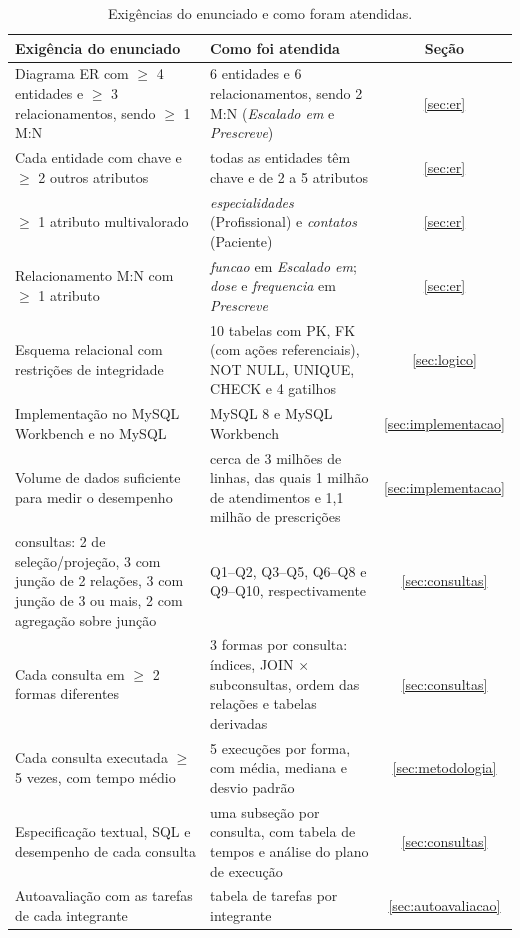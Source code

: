 \documentclass[10pt,a4paper]{article}
\begin{document}
\begin{table}[H]
\centering\footnotesize
\caption{Exigências do enunciado e como foram atendidas.}
\label{tab:requisitos}
\begin{tabularx}{\textwidth}{>{\raggedright\arraybackslash}p{5.6cm}Xc}
\toprule
Exigência do enunciado & Como foi atendida & Seção \\
\midrule
Diagrama ER com $\geq$ 4 entidades e $\geq$ 3 relacionamentos, sendo $\geq$ 1 M:N & 6 entidades e 6 relacionamentos, sendo 2 M:N (\emph{Escalado em} e \emph{Prescreve}) & \ref{sec:er} \\
Cada entidade com chave e $\geq$ 2 outros atributos & todas as entidades têm chave e de 2 a 5 atributos & \ref{sec:er} \\
$\geq$ 1 atributo multivalorado & \emph{especialidades} (Profissional) e \emph{contatos} (Paciente) & \ref{sec:er} \\
Relacionamento M:N com $\geq$ 1 atributo & \emph{funcao} em \emph{Escalado em}; \emph{dose} e \emph{frequencia} em \emph{Prescreve} & \ref{sec:er} \\
Esquema relacional com restrições de integridade & 10 tabelas com PK, FK (com ações referenciais), NOT NULL, UNIQUE, CHECK e 4 gatilhos & \ref{sec:logico} \\
Implementação no MySQL Workbench e no MySQL & MySQL 8 e MySQL Workbench & \ref{sec:implementacao} \\
Volume de dados suficiente para medir o desempenho & cerca de 3 milhões de linhas, das quais 1 milhão de atendimentos e 1,1 milhão de prescrições & \ref{sec:implementacao} \\
10 consultas: 2 de seleção/projeção, 3 com junção de 2 relações, 3 com junção de 3 ou mais, 2 com agregação sobre junção & Q1--Q2, Q3--Q5, Q6--Q8 e Q9--Q10, respectivamente & \ref{sec:consultas} \\
Cada consulta em $\geq$ 2 formas diferentes & 3 formas por consulta: índices, JOIN $\times$ subconsultas, ordem das relações e tabelas derivadas & \ref{sec:consultas} \\
Cada consulta executada $\geq$ 5 vezes, com tempo médio & 5 execuções por forma, com média, mediana e desvio padrão & \ref{sec:metodologia} \\
Especificação textual, SQL e desempenho de cada consulta & uma subseção por consulta, com tabela de tempos e análise do plano de execução & \ref{sec:consultas} \\
Autoavaliação com as tarefas de cada integrante & tabela de tarefas por integrante & \ref{sec:autoavaliacao} \\
\bottomrule
\end{tabularx}
\end{table}
\end{document}
